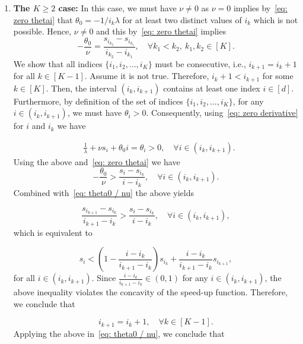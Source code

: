 \documentclass[a4paper]{article}
\theoremstyle{plain}
\theoremstyle{definition}
\theoremstyle{case}
\theoremstyle{remark}
\newcommand{\brac}[1]{\left(#1\right)}
\begin{document}
\begin{enumerate}
   \item \textbf{The $K\geq 2$ case:} In this case, we must have $\nu\neq 0$ as $\nu=0$ implies by~\eqref{eq: zero thetai} that $\theta_0=-1/i_k \lambda$ for at least two distinct values of $i_k$ which is not possible. Hence, $\nu\neq 0$ and this by~\eqref{eq: zero thetai} implies
\begin{equation} \label{eq: theta0 / nu}
    -\frac{\theta_0}{\nu} = \frac{s_{i_{k_2}} - s_{i_{k_1}}}{i_{k_2} - i_{k_1}}, \quad \forall k_1 <k_2,~ k_1, k_2 \in [K].
\end{equation}
%
 We show that all indices $\{i_1,i_2,\ldots,i_K\}$ must be consecutive, i.e., $i_{k+1}=i_k+1$ for all $k \in [K-1]$. Assume it is not true. Therefore, $i_k + 1 < i_{k+1}$ for some $ k \in [K]$. Then, the interval $\brac{i_k, i_{k+1}}$ contains at least one index $i \in [d]$. Furthermore, by definition of the set of indices $\{i_1,i_2,\ldots,i_K\}$, for any $i \in \brac{i_k, i_{k+1}}$, we must have $\theta_i >0$. Consequently, using~\eqref{eq: zero derivative} for $i$ and $i_k$ we have

\begin{align}
   &\frac{1}{\lambda} + \nu s_i + \theta_0 i  = \theta_i >0, \quad \forall i \in \brac{i_k, i_{k+1}}.
\end{align}
Using the above and~\eqref{eq: zero thetai} we have
\begin{equation}
    -\frac{\theta_0}{\nu} > \frac{s_i - s_{i_k}}{i - i_k},\quad \forall i \in \brac{i_k, i_{k+1}}.
\end{equation}
%
Combined with~\eqref{eq: theta0 / nu} the above yields

\begin{equation}
    \frac{s_{i_{k+1}} - s_{i_k}}{i_{k+1} - i_k} >\frac{s_i - s_{i_k}}{i - i_k}, \quad \forall i \in \brac{i_k, i_{k+1}},
\end{equation}
%
which is equivalent to

\begin{equation}
    s_i < \brac{1- \frac{i - i_k}{i_{k+1}-i_k}} s_{i_k} + \frac{i-i_k}{i_{k+1} - i_k} s_{i_{k+1}}, 
\end{equation}
%
for all $i \in \brac{i_k, i_{k+1}}$. Since $\frac{i - i_k}{i_{k+1}-i_k} \in (0,1)$ for any $i \in \brac{i_k, i_{k+1}}$, the above inequality violates the concavity of the speed-up function. Therefore, we conclude that

\begin{equation} \label{eq: consecutive index}
    i_{k+1} = i_k +1, \quad \forall k \in [K-1].
\end{equation}
%
Applying the above in~\eqref{eq: theta0 / nu}, we conclude that 


\end{enumerate}
\end{document}
